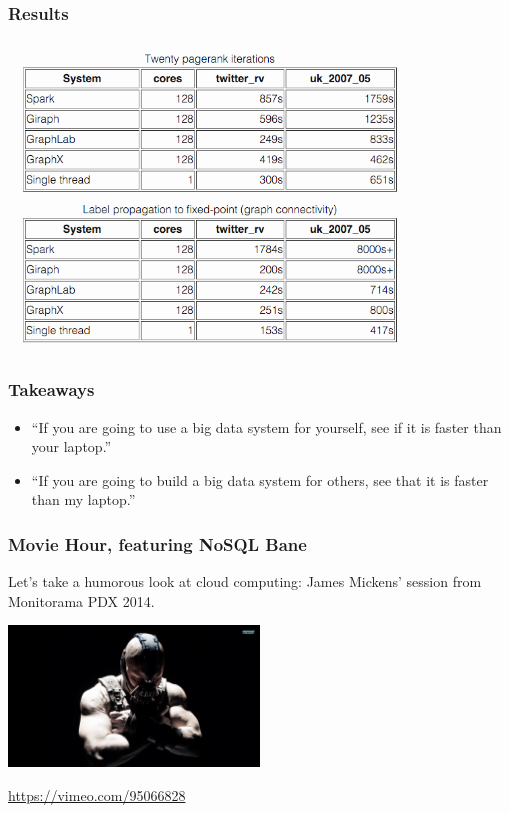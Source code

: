 \begin{frame}
\frametitle{Results}

\begin{center}
	\includegraphics[width=0.80\textwidth]{images/pagerank.png}
\end{center}


\end{frame}



\begin{frame}
\frametitle{Takeaways}


\begin{changemargin}{1cm}

\begin{itemize}
\item    ``If you are going to use a big data system for yourself, see if it is faster than your laptop.''\\[1em]
\item    ``If you are going to build a big data system for others, see that it is faster than my laptop.''
\end{itemize}

\end{changemargin}
\end{frame}




\begin{frame}
\frametitle{Movie Hour, featuring NoSQL Bane}

Let's take a humorous look at cloud computing: James Mickens' session from Monitorama PDX 2014. 

\begin{center}
	\includegraphics[width=0.5\textwidth]{images/bane.jpg}
\end{center}

\begin{center}
\url{https://vimeo.com/95066828}
\end{center}


\end{frame}



